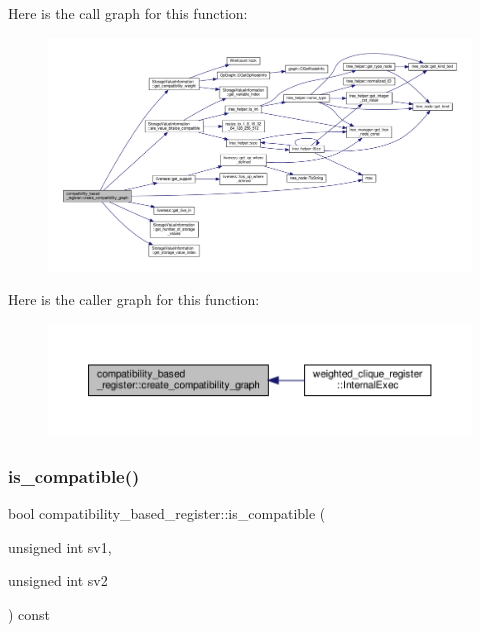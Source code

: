 Here is the call graph for this function\+:
\nopagebreak
\begin{figure}[H]
\begin{center}
\leavevmode
\includegraphics[width=350pt]{d0/d1b/classcompatibility__based__register_afe19d2dd6d74dd1cee14ef01a3035c8e_cgraph}
\end{center}
\end{figure}
Here is the caller graph for this function\+:
\nopagebreak
\begin{figure}[H]
\begin{center}
\leavevmode
\includegraphics[width=350pt]{d0/d1b/classcompatibility__based__register_afe19d2dd6d74dd1cee14ef01a3035c8e_icgraph}
\end{center}
\end{figure}
\mbox{\label{classcompatibility__based__register_aa23fe5b86c033e8d6cee7cd85d559d57}} 
\subsubsection{\texorpdfstring{is\+\_\+compatible()}{is\_compatible()}}
{\footnotesize\ttfamily bool compatibility\+\_\+based\+\_\+register\+::is\+\_\+compatible (\begin{DoxyParamCaption}\item[{unsigned int}]{sv1,  }\item[{unsigned int}]{sv2 }\end{DoxyParamCaption}) const}



